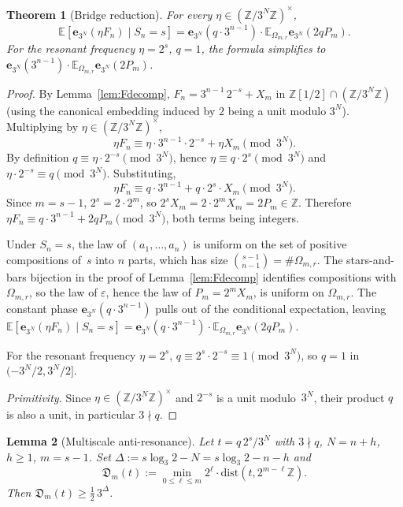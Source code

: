 \documentclass[11pt,a4paper]{amsart}
\theoremstyle{plain}
\newtheorem{theorem}{Theorem}[section]
\newtheorem{lemma}[theorem]{Lemma}
\theoremstyle{definition}
\newcommand{\Z}{\mathbb{Z}}
\newcommand{\E}{\mathbb{E}}
\newcommand{\dist}{\mathrm{dist}}
\begin{document}
\begin{theorem}[Bridge reduction]\label{thm:reduction}
For every $\eta\in(\Z/3^N\Z)^\times$,
\begin{equation}\label{eq:reductioneq}
\E[\mathbf e_{3^N}(\eta F_n)\mid S_n=s]
=\mathbf e_{3^N}(q\cdot 3^{n-1})\cdot\E_{\Omega_{m,r}}\mathbf e_{3^N}(2qP_m).
\end{equation}
For the resonant frequency $\eta=2^s$, $q=1$, the formula simplifies to
$\mathbf e_{3^N}(3^{n-1})\cdot\E_{\Omega_{m,r}}\mathbf e_{3^N}(2P_m)$.
\end{theorem}

\begin{proof}
By Lemma~\ref{lem:Fdecomp}, $F_n=3^{n-1}\,2^{-s}+X_m$ in
$\Z[1/2]\cap(\Z/3^N\Z)$ (using the canonical embedding induced by
$2$ being a unit modulo $3^N$).
Multiplying by $\eta\in(\Z/3^N\Z)^\times$,
$$
\eta F_n\equiv\eta\cdot 3^{n-1}\cdot 2^{-s}+\eta X_m\pmod{3^N}.
$$
By definition $q\equiv\eta\cdot 2^{-s}\pmod{3^N}$, hence
$\eta\equiv q\cdot 2^s\pmod{3^N}$ and $\eta\cdot 2^{-s}\equiv q\pmod{3^N}$.
Substituting,
\begin{equation}\label{eq:etaFn}
\eta F_n\equiv q\cdot 3^{n-1}+q\cdot 2^s\cdot X_m\pmod{3^N}.
\end{equation}
Since $m=s-1$, $2^s=2\cdot 2^m$, so $2^s X_m=2\cdot 2^m X_m=2P_m\in\Z$.
Therefore $\eta F_n\equiv q\cdot 3^{n-1}+2qP_m\pmod{3^N}$, both terms
being integers.

Under $S_n=s$, the law of $(a_1,\dots,a_n)$ is uniform on the set of
positive compositions of~$s$ into $n$ parts, which has size
$\binom{s-1}{n-1}=\#\Omega_{m,r}$.
The stars-and-bars bijection in the proof of Lemma~\ref{lem:Fdecomp}
identifies compositions with $\Omega_{m,r}$, so the law of $\varepsilon$,
hence the law of $P_m=2^m X_m$, is uniform on $\Omega_{m,r}$.
The constant phase $\mathbf e_{3^N}(q\cdot 3^{n-1})$ pulls out of the
conditional expectation, leaving
$\E[\mathbf e_{3^N}(\eta F_n)\mid S_n=s]=\mathbf e_{3^N}(q\cdot 3^{n-1})\cdot
\E_{\Omega_{m,r}}\mathbf e_{3^N}(2qP_m)$.

For the resonant frequency $\eta=2^s$, $q\equiv 2^s\cdot 2^{-s}\equiv 1\pmod{3^N}$,
so $q=1$ in $(-3^N/2,3^N/2]$.

\emph{Primitivity.}
Since $\eta\in(\Z/3^N\Z)^\times$ and $2^{-s}$ is a unit modulo~$3^N$, their
product $q$ is also a unit, in particular $3\nmid q$.
\end{proof}

\begin{lemma}[Multiscale anti-resonance]\label{lem:antires}
Let $t=q\,2^s/3^N$ with $3\nmid q$, $N=n+h$, $h\ge1$, $m=s-1$.
Set $\Delta:=s\log_3 2-N=s\log_3 2-n-h$ and
$$
\mathfrak D_m(t):=\min_{0\le\ell\le m}2^\ell\cdot\dist(t,2^{m-\ell}\Z).
$$
Then $\mathfrak D_m(t)\ge\frac12\,3^\Delta$.
\end{lemma}
\end{document}
